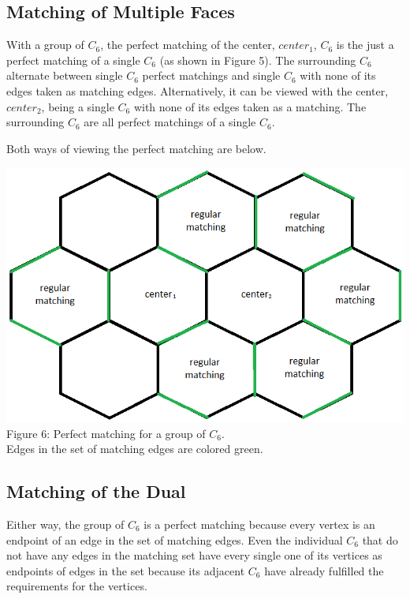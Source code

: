 \documentclass[12pt]{article}
\begin{document}
\begin{flushleft}
\subsection*{Matching of Multiple Faces}
\medskip
With a group of $C_6$, the perfect matching of the center, $center_1$, $C_6$ is the just a perfect matching of a single $C_6$ (as shown in Figure 5). The surrounding $C_6$ alternate between single $C_6$ perfect matchings and single $C_6$ with none of its edges taken as matching edges. Alternatively, it can be viewed with the center, $center_2$, being a single $C_6$ with none of its edges taken as a matching. The surrounding $C_6$ are all perfect matchings of a single $C_6$.

\newpage
\medskip
Both ways of viewing the perfect matching are below.

\begin{center}
\includegraphics[scale=0.65]{images/c6groupmatching.png}\\
Figure 6: Perfect matching for a group of $C_6$.\\
Edges in the set of matching edges are colored green.
\end{center}

\subsection*{Matching of the Dual}
\medskip
Either way, the group of $C_6$ is a perfect matching because every vertex is an endpoint of an edge in the set of matching edges. Even the individual $C_6$ that do not have any edges in the matching set have every single one of its vertices as endpoints of edges in the set because its adjacent $C_6$ have already fulfilled the requirements for the vertices.


\end{flushleft}
\end{document}
